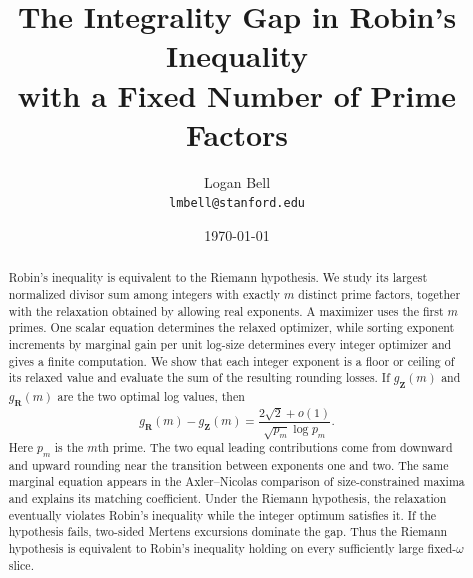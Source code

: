 \documentclass[11pt]{article}
\title{The Integrality Gap in Robin's Inequality\\
with a Fixed Number of Prime Factors}
\author{Logan Bell \\ \texttt{lmbell@stanford.edu}}
\date{\today}
\numberwithin{equation}{section}
\newcommand{\reals}{\mathbf{R}}
\newcommand{\integers}{\mathbf{Z}}
\theoremstyle{plain}
\theoremstyle{remark}
\begin{document}
\maketitle

\begin{abstract}
Robin's inequality is equivalent to the Riemann hypothesis. We study its
largest normalized divisor sum among integers with exactly \(m\) distinct
prime factors, together with the relaxation obtained by allowing real
exponents. A maximizer uses the first \(m\) primes. One scalar equation
determines the relaxed optimizer, while sorting exponent increments by
marginal gain per unit log-size determines every integer optimizer and
gives a finite computation. We show that each integer exponent is a floor
or ceiling of its relaxed value and evaluate the sum of the resulting
rounding losses. If \(g_{\integers}(m)\) and \(g_{\reals}(m)\) are the two
optimal log values, then
\[
    g_{\reals}(m)-g_{\integers}(m)
    =
    \frac{2\sqrt2+o(1)}
    {\sqrt{p_m}\log p_m}.
\]
Here \(p_m\) is the \(m\)th prime. The two equal leading contributions
come from downward and upward rounding near the transition between
exponents one and two. The same marginal equation appears in the
Axler--Nicolas comparison of size-constrained maxima and explains its
matching coefficient. Under the Riemann hypothesis, the relaxation
eventually violates Robin's inequality while the integer optimum satisfies
it. If the hypothesis fails, two-sided Mertens excursions dominate the
gap. Thus the Riemann hypothesis is equivalent to Robin's inequality
holding on every sufficiently large fixed-\(\omega\) slice.
\end{abstract}













\end{document}
